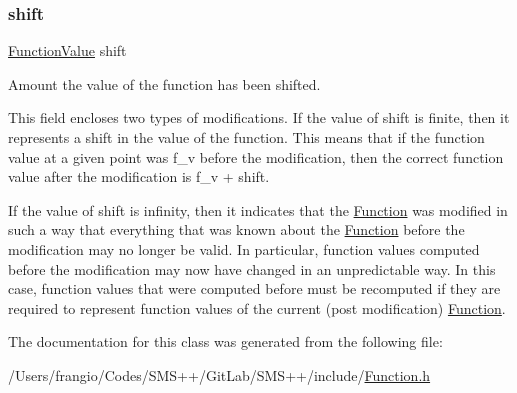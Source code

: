 \subsubsection{\texorpdfstring{shift}{shift}}
{\footnotesize\ttfamily \mbox{\hyperlink{class_s_m_spp__di__unipi__it_1_1_function_mod_a44f54e31f9fa8a29194218c234876284}{Function\+Value}} shift}



Amount the value of the function has been shifted. 

This field encloses two types of modifications. If the value of shift is finite, then it represents a shift in the value of the function. This means that if the function value at a given point was f\+\_\+v before the modification, then the correct function value after the modification is f\+\_\+v + shift.

If the value of shift is infinity, then it indicates that the \mbox{\hyperlink{class_s_m_spp__di__unipi__it_1_1_function}{Function}} was modified in such a way that everything that was known about the \mbox{\hyperlink{class_s_m_spp__di__unipi__it_1_1_function}{Function}} before the modification may no longer be valid. In particular, function values computed before the modification may now have changed in an unpredictable way. In this case, function values that were computed before must be recomputed if they are required to represent function values of the current (post modification) \mbox{\hyperlink{class_s_m_spp__di__unipi__it_1_1_function}{Function}}. 

The documentation for this class was generated from the following file\+:\begin{DoxyCompactItemize}
\item 
/\+Users/frangio/\+Codes/\+S\+M\+S++/\+Git\+Lab/\+S\+M\+S++/include/\mbox{\hyperlink{_function_8h}{Function.\+h}}\end{DoxyCompactItemize}

